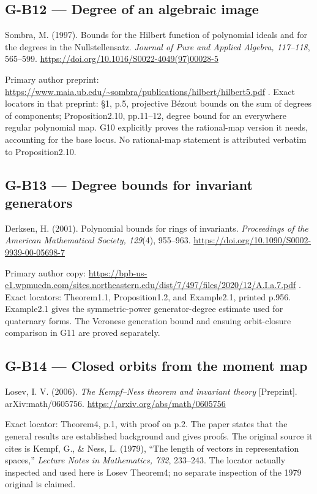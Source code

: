 \documentclass[11pt,a4paper]{article}
\theoremstyle{definition}\newtheorem{definition}{Definition}
\begin{document}
\subsection{G-B12 --- Degree of an algebraic
image}\label{g-b12--degree-of-an-algebraic-image}

Sombra, M. (1997). Bounds for the Hilbert function of polynomial ideals
and for the degrees in the Nullstellensatz. \emph{Journal of Pure and
Applied Algebra, 117--118}, 565--599.
\url{https://doi.org/10.1016/S0022-4049(97)00028-5}

Primary author preprint:
\url{https://www.maia.ub.edu/~sombra/publications/hilbert/hilbert5.pdf}
. Exact locators in that preprint: §1, p.5, projective Bézout bounds on
the sum of degrees of components; Proposition2.10, pp.11--12, degree
bound for an everywhere regular polynomial map. G10 explicitly proves
the rational-map version it needs, accounting for the base locus. No
rational-map statement is attributed verbatim to Proposition2.10.

\subsection{G-B13 --- Degree bounds for invariant
generators}\label{g-b13--degree-bounds-for-invariant-generators}

Derksen, H. (2001). Polynomial bounds for rings of invariants.
\emph{Proceedings of the American Mathematical Society, 129}(4),
955--963. \url{https://doi.org/10.1090/S0002-9939-00-05698-7}

Primary author copy:
\url{https://bpb-us-e1.wpmucdn.com/sites.northeastern.edu/dist/7/497/files/2020/12/A.I.a.7.pdf}
. Exact locators: Theorem1.1, Proposition1.2, and Example2.1, printed
p.956. Example2.1 gives the symmetric-power generator-degree estimate
used for quaternary forms. The Veronese generation bound and ensuing
orbit-closure comparison in G11 are proved separately.

\subsection{G-B14 --- Closed orbits from the moment
map}\label{g-b14--closed-orbits-from-the-moment-map}

Losev, I. V. (2006). \emph{The Kempf--Ness theorem and invariant theory}
{[}Preprint{]}. arXiv:math/0605756.
\url{https://arxiv.org/abs/math/0605756}

Exact locator: Theorem4, p.1, with proof on p.2. The paper states that
the general results are established background and gives proofs. The
original source it cites is Kempf, G., \& Ness, L. (1979), ``The length
of vectors in representation spaces,'' \emph{Lecture Notes in
Mathematics, 732}, 233--243. The locator actually inspected and used
here is Losev Theorem4; no separate inspection of the 1979 original is
claimed.
\end{document}
